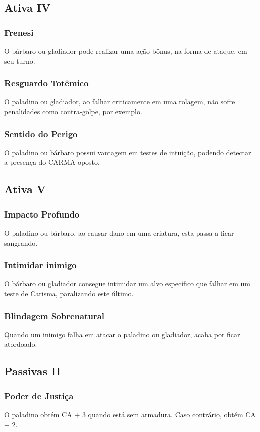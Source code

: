 \documentclass[10pt,twoside,twocolumn]{book}
\begin{document}
\subsection*{Ativa IV}
\subsubsection*{Frenesi}
O bárbaro ou gladiador pode realizar uma ação bônus, na forma de ataque, em seu turno.
\subsubsection*{Resguardo Totêmico}
O paladino ou gladiador, ao falhar criticamente em uma rolagem, não sofre penalidades como contra-golpe, por exemplo.
\subsubsection*{Sentido do Perigo}
O paladino ou bárbaro possui vantagem em testes de intuição, podendo detectar a presença do CARMA oposto.

\subsection*{Ativa V}
\subsubsection*{Impacto Profundo}
O paladino ou bárbaro, ao causar dano em uma criatura, esta passa a ficar sangrando.
\subsubsection*{Intimidar inimigo}
O bárbaro ou gladiador consegue intimidar um alvo específico que falhar em um teste de Carisma, paralizando este último.
\subsubsection*{Blindagem Sobrenatural}
Quando um inimigo falha em atacar o paladino ou gladiador, acaba por ficar atordoado.

\subsection*{Passivas II}
\subsubsection*{Poder de Justiça}
O paladino obtém CA + 3 quando está sem armadura. Caso contrário, obtém CA + 2.
\end{document}
